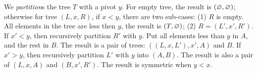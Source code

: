 \documentclass[b5paper]{article}
\begin{document}
\be
{}
\ee

We \textit{partition}s the tree $T$ with a pivot $y$. For empty tree, the result is $(\varnothing, \varnothing)$; otherwise for tree $(L, x, R)$, if $x < y$, there are two sub-cases: (1) $R$ is empty. All elements in the tree are less then $y$, the result is $(T, \varnothing)$; (2) $R = (L', x', R')$. If $x' < y$, then recursively partition $R'$ with $y$. Put all elements less than $y$ in $A$, and the rest in $B$. The result is a pair of trees: $((L, x, L'), x', A)$ and $B$. If $x' > y$, then recursively partition $L'$ with $y$ into $(A, B)$. The result is also a pair of $(L, x, A)$ and $(B, x', R')$. The result is symmetric when $y < x$.
\end{document}
